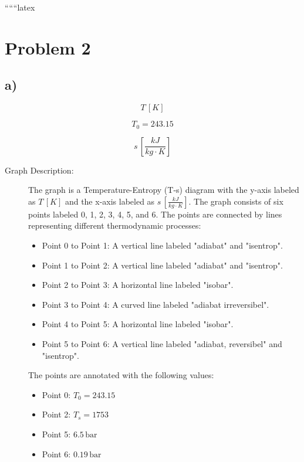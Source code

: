 
``````latex


\section*{Problem 2}

\subsection*{a)}

\[
T \, [K]
\]

\[
T_0 = 243.15
\]

\[
s \, \left[ \frac{kJ}{kg \cdot K} \right]
\]

\begin{description}
    \item[Graph Description:] 
    The graph is a Temperature-Entropy (T-s) diagram with the y-axis labeled as \( T \, [K] \) and the x-axis labeled as \( s \, \left[ \frac{kJ}{kg \cdot K} \right] \). The graph consists of six points labeled 0, 1, 2, 3, 4, 5, and 6. The points are connected by lines representing different thermodynamic processes:
    \begin{itemize}
        \item Point 0 to Point 1: A vertical line labeled "adiabat" and "isentrop".
        \item Point 1 to Point 2: A vertical line labeled "adiabat" and "isentrop".
        \item Point 2 to Point 3: A horizontal line labeled "isobar".
        \item Point 3 to Point 4: A curved line labeled "adiabat irreversibel".
        \item Point 4 to Point 5: A horizontal line labeled "isobar".
        \item Point 5 to Point 6: A vertical line labeled "adiabat, reversibel" and "isentrop".
    \end{itemize}
    The points are annotated with the following values:
    \begin{itemize}
        \item Point 0: \( T_0 = 243.15 \)
        \item Point 2: \( T_s = 1753 \)
        \item Point 5: \( 6.5 \, \text{bar} \)
        \item Point 6: \( 0.19 \, \text{bar} \)
    \end{itemize}
\end{description}

